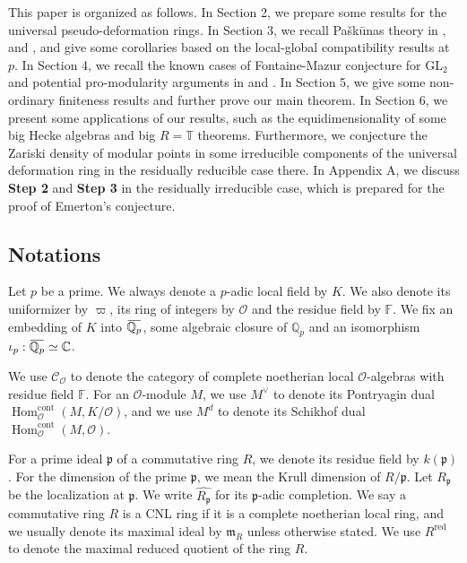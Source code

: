 \documentclass[a4paper, 12pt]{amsart}
\DeclareMathOperator{\Hom}{Hom}
\def\cont{\mathrm{cont}}
\newcommand{\F}{\mathbb{F}}
\newcommand{\Q}{\mathbb{Q}}
\newcommand{\T}{\mathbb{T}}
\newcommand{\bC}{\mathbb{C}}
\newcommand{\GL}{\mathrm{GL}}
\newcommand{\cO}{\mathcal{O}}
\newcommand{\kp}{\mathfrak{p}}
\newcommand{\overbar}[1]{\mkern 1.5mu\overline{\mkern-1.5mu#1\mkern-1.5mu}\mkern 1.5mu}
\begin{document}
    This paper is organized as follows. In Section 2, we prepare some results for the universal pseudo-deformation rings. In Section 3, we recall Pašk\=unas theory in \cite{Pa_k_nas_2013}, \cite{Pa_k_nas_2021} and \cite{Paskunas_2021}, and give some corollaries based on the local-global compatibility results at $p$. In Section 4, we recall the known cases of Fontaine-Mazur conjecture for $\GL_2$ and potential pro-modularity arguments in \cite{Zhang:2024ab} and \cite{Zhang:2024aa}. In Section 5, we give some non-ordinary finiteness results and further prove our main theorem. In Section 6, we present some applications of our results, such as the equidimensionality of some big Hecke algebras and big $R=\T $ theorems. Furthermore, we conjecture the Zariski density of modular points in some irreducible components of the universal deformation ring in the residually reducible case there. In Appendix A, we discuss \textbf{Step 2} and \textbf{Step 3} in the residually irreducible case, which is prepared for the proof of Emerton's conjecture.
    
	
	\subsection{Notations}
	
		Let $p$ be a prime. We always denote a $p$-adic local field by $K$. We also denote its uniformizer by $\varpi$, its ring of integers by $\cO$ and the residue field by $\F$. We fix an embedding of $K$ into $\overbar{\Q_p}$, some algebraic closure of $\Q_p$ and an isomorphism $\iota_p:\overbar{\Q_p}\simeq \bC$.
	
	We use $\mathcal{C}_{\mathcal{O}}$ to denote the category of complete noetherian local $\cO$-algebras with residue field $\F$. For an $\cO$-module $M$, we use $M^\vee$ to denote its Pontryagin dual $\Hom_{\cO}^{\cont}(M, K/\cO)$, and we use $M^d$ to denote its Schikhof dual $\Hom_{\cO}^{\cont}(M, \cO)$. 
	
	For a prime ideal $\kp$ of a commutative ring $R$, we denote its residue field by $k(\kp)$. For the dimension of the prime $\kp$, we mean the Krull dimension of $R/\kp$. Let $R_\kp$ be the localization at $\kp$. We write $\widehat{R_\kp}$ for its $\kp$-adic completion. We say a commutative ring $R$ is a CNL ring if it is a complete noetherian local ring, and we usually denote its maximal ideal by $\mathfrak{m}_R$ unless otherwise stated. We use $R^{\operatorname{red}}$ to denote the maximal reduced quotient of the ring $R$.
	
\end{document}
